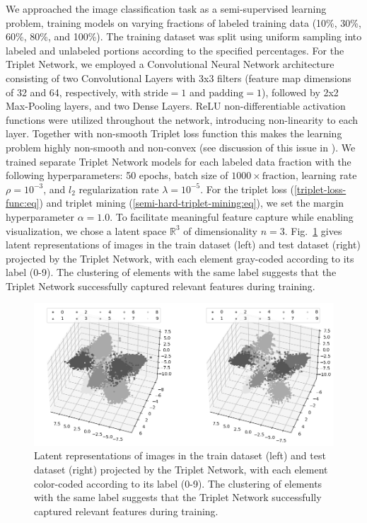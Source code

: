 We approached the image classification task as a semi-supervised learning problem, training models on varying fractions of labeled training data (10\%, 30\%, 60\%, 80\%, and 100\%). The training dataset was split using uniform sampling into labeled and unlabeled portions according to the specified percentages. For the Triplet Network, we employed a Convolutional Neural Network architecture consisting of two Convolutional Layers with 3x3 filters (feature map dimensions of 32 and 64, respectively, with $\text{stride}=1$ and $\text{padding}=1$), followed by 2x2 Max-Pooling layers, and two Dense Layers. ReLU non-differentiable activation functions were utilized throughout the network, introducing non-linearity to each layer. Together with non-smooth Triplet loss function this makes the learning problem highly non-smooth and non-convex (see discussion of this issue in \cite{Norkin_2021}). We trained separate Triplet Network models for each labeled data fraction with the following hyperparameters: 50 epochs, batch size of $1000 \times \text{fraction}$, learning rate $\rho = 10^{-3}$, and $l_2$ regularization rate $\lambda = 10^{-5}$. For the triplet loss (\ref{triplet-loss-func:eq}) and triplet mining (\ref{semi-hard-triplet-mining:eq}), we set the margin hyperparameter $\alpha = 1.0$. To facilitate meaningful feature capture while enabling visualization, we chose a latent space $\mathbb{R}^3$ of dimensionality $n=3$. Fig.~\ref{latent-space:fig} gives latent representations of images in the train dataset (left) and test dataset (right) projected by the Triplet Network, with each element gray-coded according to its label (0-9). The clustering of elements with the same label suggests that the Triplet Network successfully captured relevant features during training.

\begin{figure}
    \centering
    \includegraphics[width=\textwidth]{figures/latent_space.png}
    \caption{Latent representations of images in the train dataset (left) and test dataset (right) projected by the Triplet Network, with each element color-coded according to its label (0-9). The clustering of elements with the same label suggests that the Triplet Network successfully captured relevant features during training.}
    \label{latent-space:fig}
\end{figure}

